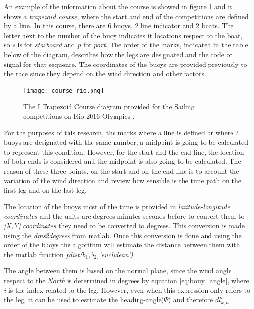 An example of the information about the course is showed in figure \ref{fig:Rio_Course1} and it shows a \textit{trapezoid course}, where the start and end of the competitions are defined by a line. In this course, there are 6 buoys, 2 line indicator and 2 boats. The letter next to the number of the buoy indicates it locations respect to the boat, so \textit{s} is for \textit{starboard} and \textit{p} for \textit{port}. The order of the marks, indicated in the table below of the diagram, describes how the legs are designated and the code or signal for that sequence. The coordinates of the buoys are provided previously to the race since they depend on the wind direction and other factors.  \par 
\begin{figure} [hbt!]
    \centering
    \texttt{[image: course\_rio.png]}
    \caption{The I Trapezoid Course diagram provided for the Sailing competitions on Rio 2016 Olympics \cite{sailoly}.}
    \label{fig:Rio_Course1}
\end{figure}
For the purposes of this research, the marks where a line is defined or where 2 buoys are designated with the same number, a midpoint is going to be calculated to represent this condition. However, for the start and the end line, the location of both ends is considered and the midpoint is also going to be calculated. The reason of these three points, on the start and on the end line is to account the variation of the wind direction and review how sensible is the time path on the first leg and on the last leg. \par

The location of the buoys most of the time is provided in \textit{latitude-longitude coordinates} and the units are degrees-minutes-seconds before to convert them to \textit{[X,Y] coordinates} they need to be converted to degrees. This conversion is made using the \textit{dms2degrees} from \acrshort{matlab}. Once this conversion is done and using the order of the buoys the algorithm will estimate the distance between them with the \acrshort{matlab} function \textit{pdist($b_{1},b_{2}$,'euclidean')}. \par \noindent The angle between them is based on the normal plane, since the wind angle respect to the \textit{North} is determined in degrees by equation \ref{eq:bouy_angle}, where \textit{i} is the index related to the leg. However, even when this expression only refers to the leg, it can be used to estimate the heading-angle($\Psi$) and  therefore $dl_{k,n}^{i}$. \par 

